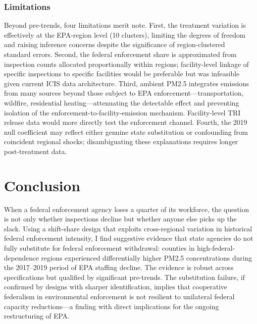 \documentclass[12pt]{article}
\begin{document}
\subsubsection*{Limitations} Beyond pre-trends, four limitations merit note. First, the treatment variation is effectively at the EPA-region level (10 clusters), limiting the degrees of freedom and raising inference concerns despite the significance of region-clustered standard errors. Second, the federal enforcement share is approximated from inspection counts allocated proportionally within regions; facility-level linkage of specific inspections to specific facilities would be preferable but was infeasible given current ICIS data architecture. Third, ambient PM2.5 integrates emissions from many sources beyond those subject to EPA enforcement---transportation, wildfire, residential heating---attenuating the detectable effect and preventing isolation of the enforcement-to-facility-emission mechanism. Facility-level TRI release data would more directly test the enforcement channel. Fourth, the 2019 null coefficient may reflect either genuine state substitution or confounding from coincident regional shocks; disambiguating these explanations requires longer post-treatment data.

\section{Conclusion}

When a federal enforcement agency loses a quarter of its workforce, the question is not only whether inspections decline but whether anyone else picks up the slack. Using a shift-share design that exploits cross-regional variation in historical federal enforcement intensity, I find suggestive evidence that state agencies do not fully substitute for federal enforcement withdrawal: counties in high-federal-dependence regions experienced differentially higher PM2.5 concentrations during the 2017--2019 period of EPA staffing decline. The evidence is robust across specifications but qualified by significant pre-trends. The substitution failure, if confirmed by designs with sharper identification, implies that cooperative federalism in environmental enforcement is not resilient to unilateral federal capacity reductions---a finding with direct implications for the ongoing restructuring of EPA.

\label{apep_main_text_end}

\newpage


\end{document}
